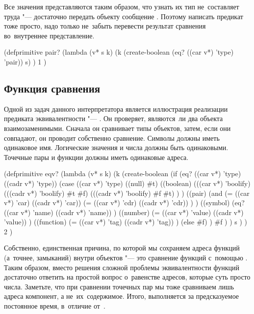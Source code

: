 Все значения представляются таким образом, что узнать их тип не~составляет труда
"--- достаточно передать объекту сообщение . Поэтому написать предикат
 тоже просто, надо только не~забыть перевести результат сравнения
во~внутреннее представление.

\begin{code:lisp}
(defprimitive pair?
  (lambda (v* s k)
    (k (create-boolean (eq? ((car v*) 'type) 'pair)) s) )
  1 )
\end{code:lisp}


\subsection{Функция сравнения}%
\label{assignment/implementation/ssect:comparisons}

Одной из задач данного интерпретатора является иллюстрация реализации предиката
эквивалентности "--- . Он проверяет, являются~ли два объекта
взаимозаменимыми. Сначала он сравнивает типы объектов, затем, если они
совпадают, он проводит собственно сравнение. Символы должны иметь одинаковое
имя. Логические значения и числа должны быть одинаковыми. Точечные пары и
функции должны иметь одинаковые адреса.

\begin{code:lisp}
(defprimitive eqv?
  (lambda (v* s k)
    (k (create-boolean
        (if (eq? ((car v*) 'type) ((cadr v*) 'type))
            (case ((car v*) 'type)
              ((null) #t)
              ((boolean)
               (((car v*) 'boolify)
                (((cadr v*) 'boolify) #t #f)
                (((cadr v*) 'boolify) #f #t) ) )
              ((pair)
               (and (= ((car v*) 'car) ((cadr v*) 'car))
                    (= ((car v*) 'cdr) ((cadr v*) 'cdr)) ) )
              ((symbol)
               (eq? ((car v*) 'name) ((cadr v*) 'name)) )
              ((number)
               (= ((car v*) 'value) ((cadr v*) 'value)) )
              ((function)
               (= ((car v*) 'tag) ((cadr v*) 'tag)) )
              (else #f) )
            #f ) )
       s ) )
  2 )
\end{code:lisp}

Собственно, единственная причина, по которой мы сохраняем адреса функций
(а~точнее, замыканий) внутри объектов "--- это сравнение функций с~помощью
. Таким образом, вместо решения сложной проблемы эквивалентности
функций достаточно ответить на простой вопрос о~равенстве адресов, которые суть
просто числа. Заметьте, что при сравнении точечных пар мы тоже сравниваем лишь
адреса компонент, а не~их~содержимое. Итого,  выполняется за
предсказуемое постоянное время, в~отличие от~.

